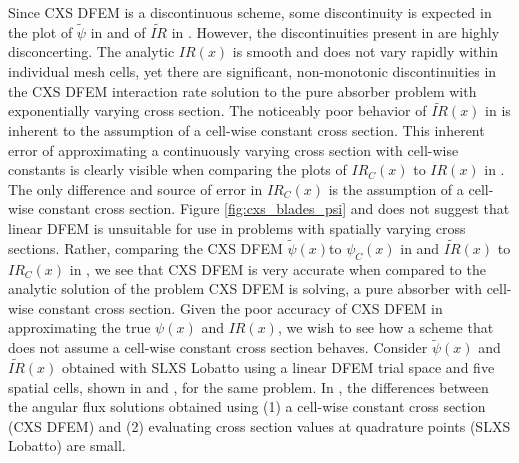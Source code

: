 Since CXS DFEM is a discontinuous scheme, some discontinuity is expected in the plot of $\widetilde{\psi}$ in  and of $\widetilde{IR}$ in . 
However, the discontinuities present in  are highly disconcerting.
The analytic $IR(x)$ is smooth and does not vary rapidly within individual mesh cells, yet there are significant, non-monotonic discontinuities in the CXS DFEM interaction rate solution to the pure absorber problem with exponentially varying cross section.
The noticeably poor behavior of $\widetilde{IR}(x)$ in  is inherent to the assumption of a cell-wise constant cross section.
This inherent error of approximating a continuously varying cross section with cell-wise constants is clearly visible when comparing the plots of $IR_C(x)$ to $IR(x)$ in .
The only difference and source of error in $IR_C(x)$ is the assumption of a cell-wise constant cross section.
Figure \ref{fig:cxs_blades_psi} and  does not suggest that linear DFEM is unsuitable for use in problems with spatially varying cross sections. 
Rather, comparing the CXS DFEM $\widetilde{\psi}(x)$to $\psi_C(x)$ in  and $\widetilde{IR}(x)$ to $IR_C(x)$ in , we see that CXS DFEM  is very accurate when compared to the analytic solution of the problem CXS DFEM is solving, a pure absorber with cell-wise constant cross section.
%
Given the poor accuracy of CXS DFEM in approximating the true $\psi(x)$ and $IR(x)$, we wish to see how a scheme that does not assume a cell-wise constant cross section behaves.
Consider $\widetilde{\psi}(x)$ and $\widetilde{IR}(x)$ obtained with SLXS Lobatto using a linear DFEM trial space and five spatial cells, shown in  and , for the same problem.  
In , the differences between the angular flux solutions obtained using (1) a cell-wise constant cross section (CXS DFEM) and (2) evaluating cross section values at quadrature points (SLXS Lobatto) are small.

